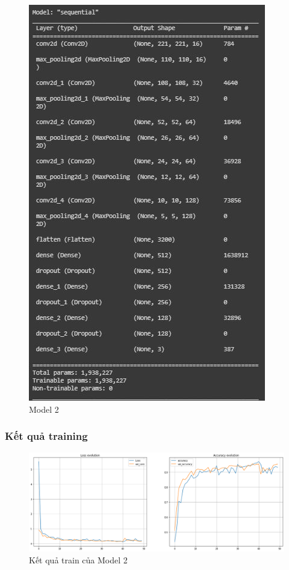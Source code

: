 \begin{center}
    \begin{figure}[!h]
        \centering
        \includegraphics[scale = 1.2]{fileanh/13.jpg}
        \caption{Model 2}
    \end{figure}
\end{center}
\subsubsection{Kết quả training}
\begin{center}
    \begin{figure}[!h]
        \centering
        \includegraphics[scale = 0.4]{fileanh/14.png}
        \caption{Kết quả train của Model 2}
    \end{figure}
\end{center}

